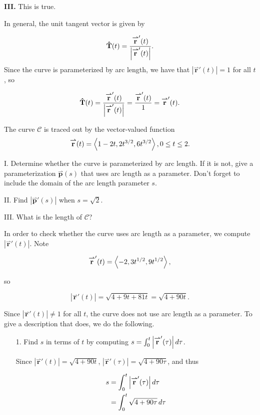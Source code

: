 \documentclass[noauthor,handout]{ximera}
\newcommand{\Magd}[2]{\left| \vec{#1}'\left(#2\right) \right|}
\renewcommand{\vec}[1]{{\overset{\boldsymbol{\rightharpoonup}}{\mathbf{#1}}}}
\begin{document}
\begin{problem}
\begin{freeResponse}
\textbf{III.} This is true.  

In general, the unit tangent vector is given by

\[
\uvec{T}(t) = \frac{\vec{r}'(t)}{\left|\vec{r}'(t)\right|}.
\]
Since the curve is parameterized by arc length, we have that $\left|\vec{r}'(t)\right| = 1$ for all $t$, so 

\[
\uvec{T}(t) = \frac{\vec{r}'(t)}{\left|\vec{r}'(t)\right|}=\frac{\vec{r}'(t)}{1} = \vec{r}'(t).
\] 

 \end{freeResponse}
\end{problem}



\begin{problem}
The curve $\mathcal{C}$ is traced out by the vector-valued function \[ \vec{r}(t) = \vector{1-2t, 2t^{3/2},6t^{3/2}}, 0 \leq t \leq 2.\]   

I. Determine whether the curve is parameterized by arc length.  If it is not, give a parameterization $\vec{p}(s)$ that uses arc length as a parameter.  Don't forget to include the domain of the arc length parameter $s$.

II. Find $\left|\vec{p}'(s)\right|$ when $s=\sqrt{2}$.

III. What is the length of $\mathcal{C}$?

\begin{freeResponse}
In order to check whether the curve uses arc length as a parameter, we compute $\left|\vec{r}'(t)\right|$.  Note

\[
\vec{r}'(t) = \vector{-2, 3 t^{1/2}, 9t^{1/2}},
\]

so 

\[
\Magd{r}{t} = \sqrt{4+9t+81t} = \sqrt{4+90t}.
\]

Since $\Magd{r}{t} \neq 1$ for all $t$, the curve does not use arc length as a parameter.  To give a description that does, we do the following.

\begin{itemize}
\item[1.] Find $s$ in terms of $t$ by computing $s = \int_0^t \left|\vec{r}'(\tau)\right| \d \tau$.

Since $\left|\vec{r}'(t)\right| = \sqrt{4+90t}$, $\left|\vec{r}'(\tau)\right| = \sqrt{4+90\tau}$, and thus

\begin{align*}
s &= \int_0^t \left|\vec{r}'(\tau)\right| \d \tau \\
&= \int_0^t \sqrt{4+90\tau} \d \tau
\end{align*}


\end{itemize}
\end{freeResponse}
\end{problem}
\end{document}

